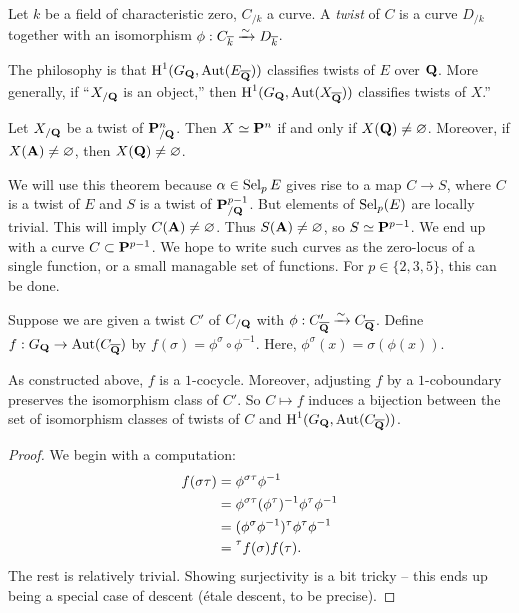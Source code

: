 \begin{definition}
Let $k$ be a field of characteristic zero, $C_{/k}$ a curve. A \emph{twist} of 
$C$ is a curve $D_{/k}$ together with an isomorphism 
$\phi:C_{\overline k}\xrightarrow\sim D_{\overline k}$. 
\end{definition}

The philosophy is that $\operatorname{H}^1(G_{\mathbf{Q}},\operatorname{Aut}(E_{\overline{\mathbf{Q}}}))$ 
classifies twists of $E$ over $\mathbf{Q}$. More generally, if ``$X_{/\mathbf{Q}}$ is an 
object,'' then $\operatorname{H}^1(G_{\mathbf{Q}},\operatorname{Aut}(X_{\overline{\mathbf{Q}}}))$ classifies 
twists of $X$.''

\begin{theorem}
Let $X_{/\mathbf{Q}}$ be a twist of $\mathbf{P}_{/\mathbf{Q}}^n$. Then $X\simeq \mathbf{P}^n$ if and only 
if $X(\mathbf{Q})\ne\varnothing$. Moreover, if $X(\mathbf{A})\ne\varnothing$, then 
$X(\mathbf{Q})\ne\varnothing$. 
\end{theorem}

We will use this theorem because $\alpha\in \operatorname{Sel}_p E$ gives rise to a map 
$C\to S$, where $C$ is a twist of $E$ and $S$ is a twist of 
$\mathbf{P}^{p-1}_{/\mathbf{Q}}$. But elements of $\operatorname{Sel}_p(E)$ are locally trivial. This 
will imply $C(\mathbf{A})\ne\varnothing$. Thus $S(\mathbf{A})\ne\varnothing$, so 
$S\simeq \mathbf{P}^{p-1}$. We end up with a curve $C\subset \mathbf{P}^{p-1}$. We hope to 
write such curves as the zero-locus of a single function, or a small 
managable set of functions. For $p\in \{2,3,5\}$, this can be done. 

Suppose we are given a twist $C'$ of $C_{/\mathbf{Q}}$ with 
$\phi:C'_{\overline{\mathbf{Q}}}\xrightarrow\sim C_{\overline{\mathbf{Q}}}$. Define 
$f:G_{\mathbf{Q}}\to \operatorname{Aut}(C_{\overline{\mathbf{Q}}})$ by 
$f(\sigma)=\phi^\sigma\circ\phi^{-1}$. Here, $\phi^\sigma(x)=\sigma(\phi(x))$. 

\begin{proposition}
As constructed above, $f$ is a $1$-cocycle. Moreover, adjusting $f$ by a 
$1$-coboundary preserves the isomorphism class of $C'$. So $C\mapsto f$ induces 
a bijection between the set of isomorphism classes of twists of $C$ and 
$\operatorname{H}^1(G_{\mathbf{Q}},\operatorname{Aut}(C_{\overline{\mathbf{Q}}}))$. 
\end{proposition}
\begin{proof}
We begin with a computation: 
\begin{align*}
  f(\sigma\tau) &= \phi^{\sigma\tau}\phi^{-1} \\ 
    &= \phi^{\sigma\tau}(\phi^\tau)^{-1}\phi^\tau\phi^{-1} \\
    &= (\phi^\sigma\phi^{-1})^\tau \phi^\tau \phi^{-1} \\
    &= \prescript{\tau}{}{f(\sigma)} f(\tau) .
\end{align*}
The rest is relatively trivial. Showing surjectivity is a bit tricky -- this 
ends up being a special case of descent (\'etale descent, to be precise). 
\end{proof}

